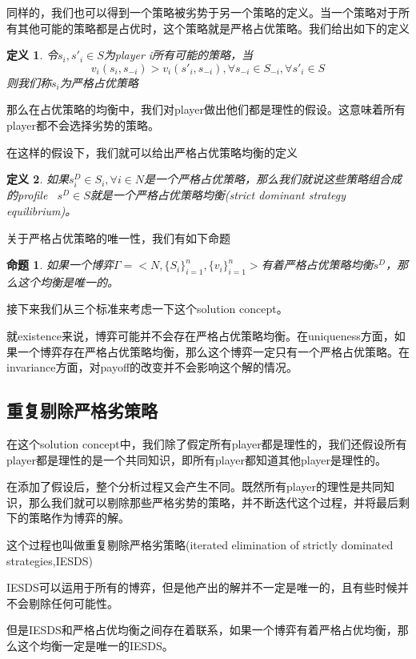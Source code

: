 \documentclass[UTF8,12pt]{ctexart}
\newtheorem{Def}{定义}[section]
\newtheorem{Prop}{命题}[section]
\numberwithin{equation}{section} %
\numberwithin{figure}{section}
\numberwithin{table}{section}
\begin{document}
	同样的，我们也可以得到一个策略被劣势于另一个策略的定义。当一个策略对于所有其他可能的策略都是占优时，这个策略就是严格占优策略。我们给出如下的定义
	\begin{Def}
		令$s_i,s'_i \in S$为player i所有可能的策略，当
		\begin{equation}
			v_i(s_i,s_{-i}) > v_i(s'_i,s_{-i}),\forall s_{-i} \in S_{-i},\forall s'_i \in S  
		\end{equation}
		则我们称$s_i$为严格占优策略
	\end{Def}
	
	那么在占优策略的均衡中，我们对player做出他们都是理性的假设。这意味着所有player都不会选择劣势的策略。
	
	在这样的假设下，我们就可以给出严格占优策略均衡的定义
	\begin{Def}
		如果$s^D_i \in S_i,\forall i \in N$是一个严格占优策略，那么我们就说这些策略组合成的profile \ $s^D \in S$就是一个严格占优策略均衡(strict dominant strategy equilibrium)。
	\end{Def}
	
	关于严格占优策略的唯一性，我们有如下命题
	\begin{Prop}
		如果一个博弈$\Gamma = <N,\{S_i\}_{i=1}^n,\{v_i\}_{i=1}^n>$有着严格占优策略均衡$s^D$，那么这个均衡是唯一的。
	\end{Prop}
	
	接下来我们从三个标准来考虑一下这个solution concept。
	
	就existence来说，博弈可能并不会存在严格占优策略均衡。在uniqueness方面，如果一个博弈存在严格占优策略均衡，那么这个博弈一定只有一个严格占优策略。在invariance方面，对payoff的改变并不会影响这个解的情况。
	
	\subsection{重复剔除严格劣策略}
	在这个solution concept中，我们除了假定所有player都是理性的，我们还假设所有player都是理性的是一个共同知识，即所有player都知道其他player是理性的。
	
	在添加了假设后，整个分析过程又会产生不同。既然所有player的理性是共同知识，那么我们就可以剔除那些严格劣势的策略，并不断迭代这个过程，并将最后剩下的策略作为博弈的解。
	
	这个过程也叫做重复剔除严格劣策略(iterated elimination of strictly
	dominated strategies,IESDS)
	
	IESDS可以运用于所有的博弈，但是他产出的解并不一定是唯一的，且有些时候并不会剔除任何可能性。
	
	但是IESDS和严格占优均衡之间存在着联系，如果一个博弈有着严格占优均衡，那么这个均衡一定是唯一的IESDS。
	
\end{document}

